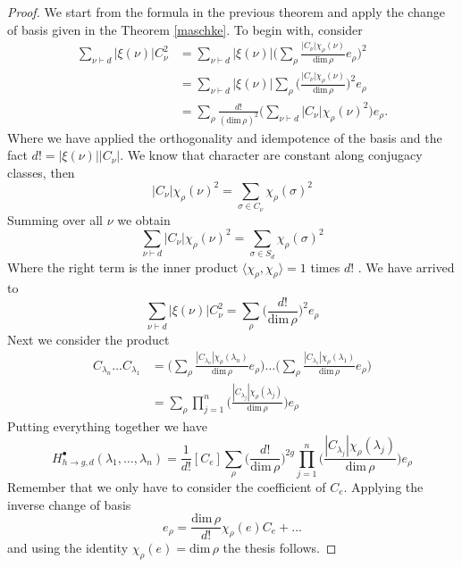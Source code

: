 \documentclass[12pt,a4paper,openright,twoside]{report}
\theoremstyle{definition} %
\begin{document}
\begin{proof}
    We start from the formula in the previous theorem and apply the change of basis given in the Theorem \ref{maschke}. To begin with, consider
    \begin{align*}
        \sum_{\nu \vdash d} |\xi(\nu)|C_{\nu}^2
        & =\sum_{\nu \vdash d} |\xi(\nu)| \biggl( \sum_{\rho} \frac{|C_{\nu}| \chi_{\rho}(\nu)}{\text{dim}\, \rho} e_{\rho} \biggr)^2 \\
        & =\sum_{\nu \vdash d} |\xi(\nu)| \sum_{\rho} \biggl( \frac{|C_{\nu}| \chi_{\rho}(\nu)}{\text{dim}\, \rho}\biggr)^2 e_{\rho}\\
        & =\sum_{\rho} \frac{d!}{(\text{dim}\, \rho)^2} \biggl( \sum_{\nu \vdash d} |C_{\nu}|\chi_{\rho}(\nu)^2\biggr) e_{\rho}.
    \end{align*}
    Where we have applied the orthogonality and idempotence of the basis and the fact \(d! = |\xi(\nu)| |C_{\nu}|\). We know that character are constant along conjugacy classes, then
    \[
    |C_{\nu}|\chi_{\rho}(\nu)^2 = \sum_{\sigma \in C_{\nu}} \chi_{\rho}(\sigma)^2
    \]
    Summing over all \(\nu\) we obtain
    \[
    \sum_{\nu \vdash d} |C_{\nu}|\chi_{\rho}(\nu)^2 = \sum_{\sigma \in S_d} \chi_{\rho}(\sigma)^2
    \]
    Where the right term is the inner product \(\langle \chi_{\rho},\chi_{\rho} \rangle = 1\) times \(d!\) . We have arrived to
    \[\sum_{\nu \vdash d} |\xi(\nu)|C_{\nu}^2 = \sum_{\rho} \biggl(\frac{d!}{\text{dim}\, \rho}\biggr)^2  e_{\rho}\]
    Next we consider the product
    \begin{align*}
        C_{\lambda_n} \ldots C_{\lambda_1} &= \biggl( \sum_{\rho} \frac{|C_{\lambda_n}| \chi_{\rho}(\lambda_n)}{\text{dim}\, \rho} e_{\rho} \biggr) \ldots \biggl( \sum_{\rho} \frac{|C_{\lambda_1}| \chi_{\rho}(\lambda_1)}{\text{dim}\, \rho} e_{\rho} \biggr)\\
        &= \sum_{\rho} \prod_{j=1}^n \biggl( \frac{|C_{\lambda_j}| \chi_{\rho}(\lambda_j)}{\text{dim}\, \rho}\biggr) e_{\rho}
    \end{align*}
    Putting everything together we have
    \[
    H_{h \to g , d}^{\bullet}(\lambda_1, \ldots, \lambda_n) =
    \frac{1}{d!} [C_e] \sum_{\rho} \biggl(\frac{d!}{\text{dim}\, \rho}\biggr)^{2g} \prod_{j=1}^n \biggl( \frac{|C_{\lambda_j}| \chi_{\rho}(\lambda_j)}{\text{dim}\, \rho}\biggr)  e_{\rho}
    \]
    Remember that we only have to consider the coefficient of \(C_e\). Applying the inverse change of basis
    \[
    e_{\rho} = \frac{\text{dim} \, \rho}{d!} \chi_{\rho}(e)C_e + \ldots
    \]
    and using the identity \(\chi_{\rho}(e) = \text{dim} \, \rho\) the thesis follows.
\end{proof}
\end{document}
